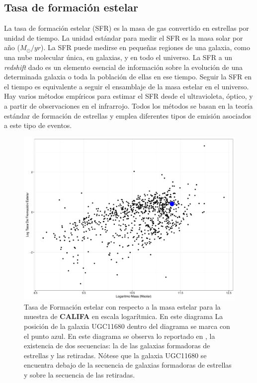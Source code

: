 \subsection{Tasa de formación estelar}

La tasa de formación estelar (SFR) es la masa de gas convertido en estrellas por unidad de tiempo.
La unidad estándar para medir el SFR es la masa solar por año ($M_{\odot}/ yr$). La SFR puede
medirse en pequeñas regiones de una  galaxia, como una nube molecular única, en
galaxias, y en todo el universo. La SFR a un \textsl{redshift} dado es un elemento esencial de
información sobre la evolución de una determinada galaxia o toda la población de ellas
en ese tiempo. Seguir la SFR en el tiempo es equivalente a seguir el ensamblaje de la masa estelar
en el universo. Hay varios métodos empíricos para estimar el SFR desde el ultravioleta, óptico,
y a partir de observaciones en el infrarrojo. Todos los métodos se basan en la teoría estándar de formación de estrellas
 y emplea diferentes tipos de emisión asociados a este tipo de eventos.

 \begin{figure}
  \centering
    \includegraphics[scale=0.5]{sfr_califa2.pdf}
  \caption[Diagrama de Tasa de Formación estelar]{Tasa de Formación estelar con respecto a
           la masa estelar para la muestra de \textbf{CALIFA} en escala logarítmica. En este diagrama La posición de la galaxia
          UGC11680 dentro del diagrama se marca con el punto azul. En este diagrama se observa lo reportado en \cite{cano2016}, la existencia de dos secuencias: la de las galaxias formadoras de estrellas y las retiradas. Nótese que la galaxia UGC11680 se encuentra debajo de la secuencia de galaxias formadoras de estrellas y sobre la secuencia de las retiradas. }
  \label{sfr_califa}
\end{figure}


